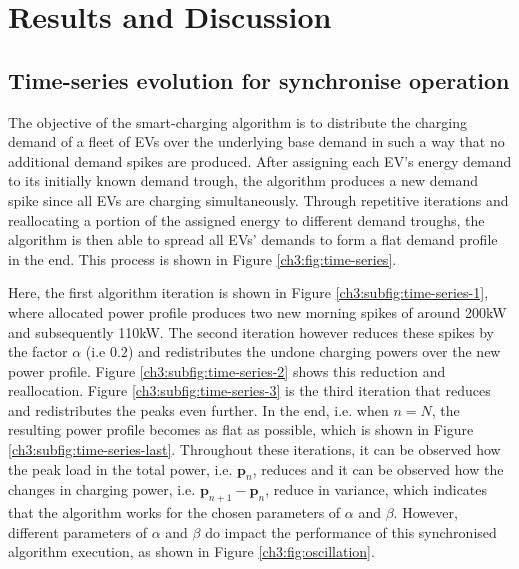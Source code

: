 \section{Results and Discussion}
\label{ch3:sec:results}

\subsection{Time-series evolution for synchronise operation}
\label{ch3:subsec:time-series-evolution}

The objective of the smart-charging algorithm is to distribute the charging demand of a fleet of EVs over the underlying base demand in such a way that no additional demand spikes are produced.
After assigning each EV's energy demand to its initially known demand trough, the algorithm produces a new demand spike since all EVs are charging simultaneously.
Through repetitive iterations and reallocating a portion of the assigned energy to different demand troughs, the algorithm is then able to spread all EVs' demands to form a flat demand profile in the end.
This process is shown in Figure \ref{ch3:fig:time-series}.



Here, the first algorithm iteration is shown in Figure \ref{ch3:subfig:time-series-1}, where allocated power profile produces two new morning spikes of around 200kW and subsequently 110kW.
The second iteration however reduces these spikes by the factor $\alpha$ (i.e $0.2$) and redistributes the undone charging powers over the new power profile.
Figure \ref{ch3:subfig:time-series-2} shows this reduction and reallocation.
Figure \ref{ch3:subfig:time-series-3} is the third iteration that reduces and redistributes the peaks even further.
In the end, i.e. when $n=N$, the resulting power profile becomes as flat as possible, which is shown in Figure \ref{ch3:subfig:time-series-last}.
Throughout these iterations, it can be observed how the peak load in the total power, i.e. $\textbf{p}_n$, reduces and it can be observed how the changes in charging power, i.e. $\textbf{p}_{n+1}-\textbf{p}_n$, reduce in variance, which indicates that the algorithm works for the chosen parameters of $\alpha$ and $\beta$.
However, different parameters of $\alpha$ and $\beta$ do impact the performance of this synchronised algorithm execution, as shown in Figure \ref{ch3:fig:oscillation}.



